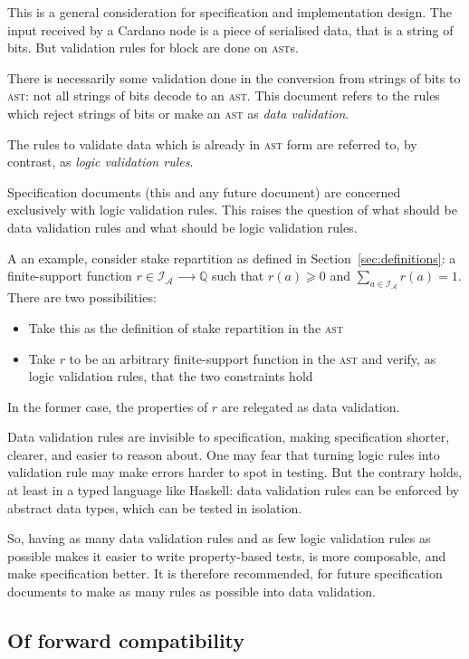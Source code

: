 \documentclass{article}
\newcommand{\idsof}[1]{\mathcal{I}\!_#1}
\newcommand{\agentids}{\idsof{\mathcal{A}}}
\begin{document}
This is a general consideration for specification and implementation
design. The input received by a Cardano node is a piece of serialised
data, that is a string of bits. But validation rules for block are
done on \textsc{ast}s.

There is necessarily some validation done in the conversion from
strings of bits to \textsc{ast}: not all strings of bits decode to an
\textsc{ast}. This document refers to the rules which reject strings
of bits or make an \textsc{ast} as \emph{data validation}.

The rules to validate data which is already in \textsc{ast} form are
referred to, by contrast, as \emph{logic validation rules}.

Specification documents (this and any future document) are concerned
exclusively with logic validation rules. This raises the
question of what should be data validation rules and what should be
logic validation rules.

A an example, consider stake repartition as defined in
Section~\ref{sec:definitions}: a finite-support function $r∈\agentids
⟶ \mathbb{Q}$ such that $r(a) ⩾ 0$ and $∑_{a∈\agentids} r(a) =
1$. There are two possibilities:
\begin{itemize}
\item Take this as the definition of stake repartition in the
  \textsc{ast}
\item Take $r$ to be an arbitrary finite-support function in the
  \textsc{ast} and verify, as logic validation rules, that the two
  constraints hold
\end{itemize}
In the former case, the properties of $r$ are relegated as data
validation.

Data validation rules are invisible to specification, making
specification shorter, clearer, and easier to reason about. One may
fear that turning logic rules into validation rule may make errors
harder to spot in testing. But the contrary holds, at least in a typed
language like Haskell: data validation rules can be enforced by abstract
data types, which can be tested in isolation.

So, having as many data validation rules and as few logic validation
rules as possible makes it easier to write property-based tests, is
more composable, and make specification better. It is therefore
recommended, for future specification documents to make as many rules
as possible into data validation.

\subsection{Of forward compatibility}
\label{sec:forward-comp}
\end{document}
